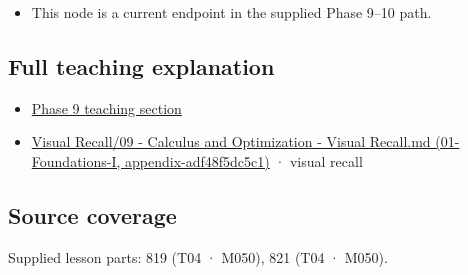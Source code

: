\begin{itemize}
\tightlist
\item
  This node is a current endpoint in the supplied Phase 9--10 path.
\end{itemize}

\subsection{Full teaching explanation}\label{full-teaching-explanation}

\begin{itemize}
\tightlist
\item
  \href{Continuous\%20Notes/Computing\%20Foundations\%20-\%20From\%20Bits\%20to\%20C++\%20and\%20Systems\%20APIs\#Multivariable\%20derivatives\%20and\%20sensitivity}{Phase 9 teaching section}
\item
  \href{}{Visual Recall/09 - Calculus and Optimization - Visual Recall.md (01-Foundations-I, appendix-adf48f5dc5c1)} · visual recall
\end{itemize}

\subsection{Source coverage}\label{source-coverage}

Supplied lesson parts: 819 (T04 · M050), 821 (T04 · M050).
